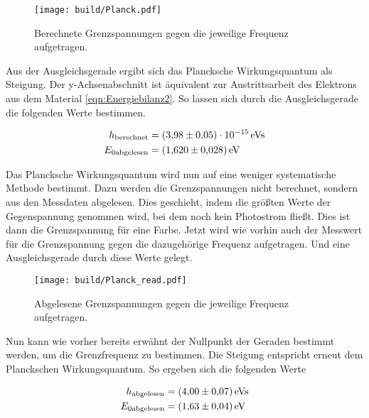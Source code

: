 \begin{figure}[H]
    \centering
    \texttt{[image: build/Planck.pdf]}
    \caption{Berechnete Grenzspannungen gegen die jeweilige Frequenz aufgetragen.}
    \label{fig:Planck}
\end{figure}

\noindent Aus der Ausgleichsgerade ergibt sich das Plancksche Wirkungsquantum als Steigung. Der y-Achsenabschnitt ist äquivalent zur 
Austrittsarbeit des Elektrons aus dem Material \ref{eqn:Energiebilanz2}. So lassen sich durch die Ausgleichsgerade die folgenden Werte 
bestimmen.

\begin{align}
    h_\text{berechnet} &=\qty{3.98\pm0.05 e-15}{e \volt \second} \\
    E_{0 \text{abgelesen}} &= \qty{1.620 \pm 0.028}{e \volt}
\end{align}

\noindent Das Plancksche Wirkungsquantum wird nun auf eine weniger systematische Methode bestimmt. Dazu werden die Grenzspannungen nicht 
berechnet, sondern aus den Messdaten abgelesen. Dies geschieht, indem die größten Werte der Gegenspannung genommen wird, bei dem noch kein 
Photostrom fließt. Dies ist dann die Grenzspannung für eine Farbe. Jetzt wird wie vorhin auch der Messwert für die Grenzspannung gegen die 
dazugehörige Frequenz aufgetragen. Und eine Ausgleichsgerade durch diese Werte gelegt.

\begin{figure}
    \centering
    \texttt{[image: build/Planck\_read.pdf]}
    \caption{Abgelesene Grenzspannungen gegen die jeweilige Frequenz aufgetragen.}
    \label{fig:Planck_read}
\end{figure}

\noindent Nun kann wie vorher bereits erwähnt der Nullpunkt der Geraden bestimmt werden, um die Grenzfrequenz zu bestimmen. Die Steigung 
entspricht erneut dem Planckschen Wirkungsquantum. So ergeben sich die folgenden Werte

\begin{align}
    h_\text{abgelesen} &= \qty{4.00 \pm 0.07}{e \volt \second}\\
    E_{0 \text{abgelesen}} &= \qty{1.63 \pm 0.04}{e \volt}
\end{align}


%
